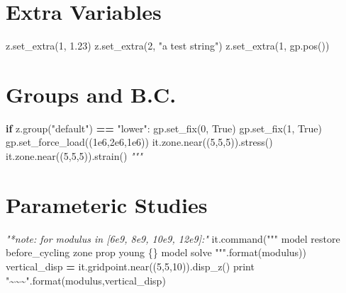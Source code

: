 \documentclass[a4paper, nobind]{templates/ociamthesis}
\newenvironment{Shaded}{\begin{snugshade}}{\end{snugshade}}
\newcommand{\BuiltInTok}[1]{#1}
\newcommand{\CommentTok}[1]{\textcolor[rgb]{0.56,0.35,0.01}{\textit{#1}}}
\newcommand{\ControlFlowTok}[1]{\textcolor[rgb]{0.13,0.29,0.53}{\textbf{#1}}}
\newcommand{\DecValTok}[1]{\textcolor[rgb]{0.00,0.00,0.81}{#1}}
\newcommand{\FloatTok}[1]{\textcolor[rgb]{0.00,0.00,0.81}{#1}}
\newcommand{\NormalTok}[1]{#1}
\newcommand{\OperatorTok}[1]{\textcolor[rgb]{0.81,0.36,0.00}{\textbf{#1}}}
\newcommand{\SpecialCharTok}[1]{\textcolor[rgb]{0.00,0.00,0.00}{#1}}
\newcommand{\StringTok}[1]{\textcolor[rgb]{0.31,0.60,0.02}{#1}}
\newcommand{\VariableTok}[1]{\textcolor[rgb]{0.00,0.00,0.00}{#1}}
\renewenvironment{Shaded}
{
  \vspace{10pt}%
  \begin{snugshade}%
}{%
  \end{snugshade}%
  \vspace{8pt}%
}
\begin{document}
\hypertarget{extra-variables}{%
\section{Extra Variables}\label{extra-variables}}

\begin{Shaded}
\begin{Highlighting}[]
\NormalTok{z.set\_extra(}\DecValTok{1}\NormalTok{, }\FloatTok{1.23}\NormalTok{)}
\NormalTok{z.set\_extra(}\DecValTok{2}\NormalTok{, }\StringTok{"a test string"}\NormalTok{)}
\NormalTok{z.set\_extra(}\DecValTok{1}\NormalTok{, gp.pos())}
\end{Highlighting}
\end{Shaded}

\hypertarget{groups-and-b.c.}{%
\section{Groups and B.C.}\label{groups-and-b.c.}}

\begin{Shaded}
\begin{Highlighting}[]
\ControlFlowTok{if}\NormalTok{ z.group(}\StringTok{"default"}\NormalTok{) }\OperatorTok{==} \StringTok{"lower"}\NormalTok{:}
\NormalTok{  gp.set\_fix(}\DecValTok{0}\NormalTok{, }\VariableTok{True}\NormalTok{)}
\NormalTok{  gp.set\_fix(}\DecValTok{1}\NormalTok{, }\VariableTok{True}\NormalTok{)}
\NormalTok{  gp.set\_force\_load((}\FloatTok{1e6}\NormalTok{,}\FloatTok{2e6}\NormalTok{,}\FloatTok{1e6}\NormalTok{))}
\NormalTok{it.zone.near((}\DecValTok{5}\NormalTok{,}\DecValTok{5}\NormalTok{,}\DecValTok{5}\NormalTok{)).stress()}
\NormalTok{it.zone.near((}\DecValTok{5}\NormalTok{,}\DecValTok{5}\NormalTok{,}\DecValTok{5}\NormalTok{)).strain()}
\CommentTok{"""}
\end{Highlighting}
\end{Shaded}

\hypertarget{parameteric-studies}{%
\section{Parameteric Studies}\label{parameteric-studies}}

\begin{Shaded}
\begin{Highlighting}[]
\CommentTok{"*note: for modulus in [6e9, 8e9, 10e9, 12e9]:"}
\NormalTok{it.command(}\StringTok{"""}
\StringTok{model restore \textquotesingle{}before\_cycling\textquotesingle{}}
\StringTok{zone prop young }\SpecialCharTok{\{\}}
\StringTok{model solve}
\StringTok{"""}\NormalTok{.}\BuiltInTok{format}\NormalTok{(modulus))}
\NormalTok{vertical\_disp }\OperatorTok{=}\NormalTok{ it.gridpoint.near((}\DecValTok{5}\NormalTok{,}\DecValTok{5}\NormalTok{,}\DecValTok{10}\NormalTok{)).disp\_z()}
\BuiltInTok{print} \StringTok{"\textasciitilde{}\textasciitilde{}\textasciitilde{}"}\NormalTok{.}\BuiltInTok{format}\NormalTok{(modulus,vertical\_disp)}
\end{Highlighting}
\end{Shaded}
\end{document}
